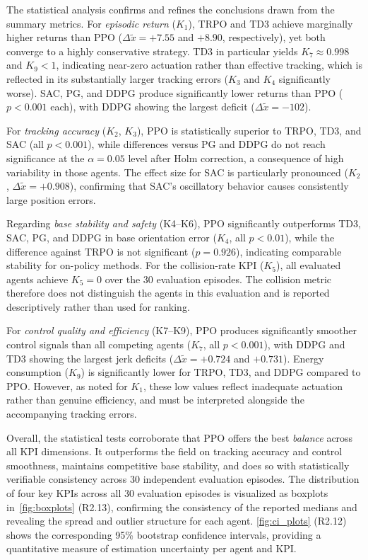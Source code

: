 \documentclass{ieeeaccess}
\begin{document}
The statistical analysis confirms and refines the conclusions drawn from the summary metrics.
For \emph{episodic return} ($K_1$), TRPO and TD3 achieve marginally higher returns than PPO
($\Delta\tilde{x}=+7.55$ and $+8.90$, respectively), yet both converge to a highly
conservative strategy. TD3 in particular yields $K_7\approx0.998$ and $K_9<1$,
indicating near-zero actuation rather than effective tracking, which is reflected in its
substantially larger tracking errors ($K_3$ and $K_4$ significantly worse).
SAC, PG, and DDPG produce significantly lower returns than PPO ($p<0.001$ each), with DDPG
showing the largest deficit ($\Delta\tilde{x}=-102$).

For \emph{tracking accuracy} ($K_2$, $K_3$), PPO is statistically superior to TRPO, TD3, and SAC
(all $p<0.001$), while differences versus PG and DDPG do not reach significance at the
$\alpha=0.05$ level after Holm correction, a consequence of high variability in those agents.
The effect size for SAC is particularly pronounced ($K_2$, $\Delta\tilde{x}=+0.908$), confirming
that SAC's oscillatory behavior causes consistently large position errors.

Regarding \emph{base stability and safety} (K4--K6), PPO significantly outperforms TD3, SAC,
PG, and DDPG in base orientation error ($K_4$, all $p<0.01$), while the difference against
TRPO
is not significant ($p=0.926$), indicating comparable stability for on-policy methods.
For the collision-rate KPI ($K_5$), all evaluated agents achieve $K_5=0$ over the 30 evaluation
episodes. The collision metric therefore does not distinguish the agents in this evaluation and
is
reported descriptively rather than used for ranking.

For \emph{control quality and efficiency} (K7--K9), PPO produces significantly smoother
control signals than all competing agents ($K_7$, all $p<0.001$), with DDPG and TD3 showing
the largest jerk deficits ($\Delta\tilde{x}=+0.724$ and $+0.731$).
Energy consumption ($K_9$) is significantly lower for TRPO, TD3, and DDPG compared to PPO.
However, as noted for $K_1$, these low values reflect inadequate actuation rather than genuine
efficiency, and must be interpreted alongside the accompanying tracking errors.

Overall, the statistical tests corroborate that PPO offers the best \emph{balance} across all
KPI dimensions. It outperforms the field on tracking accuracy and control smoothness, maintains
competitive base stability, and does so with statistically verifiable consistency across 30
independent evaluation episodes.
The distribution of four key KPIs across all 30 evaluation episodes is visualized as
boxplots
in~\autoref{fig:boxplots} (R2.13), confirming the consistency of the reported medians and revealing
the spread and outlier structure for each agent.
\autoref{fig:ci_plots} (R2.12) shows the corresponding 95\% bootstrap confidence intervals,
providing a quantitative measure of estimation uncertainty per agent and KPI.
\end{document}
